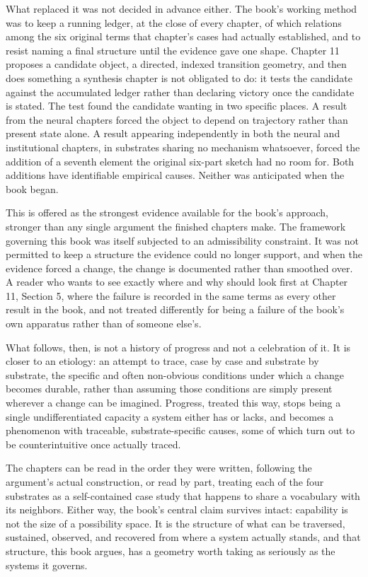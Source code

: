 \documentclass[11pt]{book}
\begin{document}
What replaced it was not decided in advance either. The book's working method was to keep a running ledger, at the close of every chapter, of which relations among the six original terms that chapter's cases had actually established, and to resist naming a final structure until the evidence gave one shape. Chapter 11 proposes a candidate object, a directed, indexed transition geometry, and then does something a synthesis chapter is not obligated to do: it tests the candidate against the accumulated ledger rather than declaring victory once the candidate is stated. The test found the candidate wanting in two specific places. A result from the neural chapters forced the object to depend on trajectory rather than present state alone. A result appearing independently in both the neural and institutional chapters, in substrates sharing no mechanism whatsoever, forced the addition of a seventh element the original six-part sketch had no room for. Both additions have identifiable empirical causes. Neither was anticipated when the book began.

This is offered as the strongest evidence available for the book's approach, stronger than any single argument the finished chapters make. The framework governing this book was itself subjected to an admissibility constraint. It was not permitted to keep a structure the evidence could no longer support, and when the evidence forced a change, the change is documented rather than smoothed over. A reader who wants to see exactly where and why should look first at Chapter 11, Section 5, where the failure is recorded in the same terms as every other result in the book, and not treated differently for being a failure of the book's own apparatus rather than of someone else's.

What follows, then, is not a history of progress and not a celebration of it. It is closer to an etiology: an attempt to trace, case by case and substrate by substrate, the specific and often non-obvious conditions under which a change becomes durable, rather than assuming those conditions are simply present wherever a change can be imagined. Progress, treated this way, stops being a single undifferentiated capacity a system either has or lacks, and becomes a phenomenon with traceable, substrate-specific causes, some of which turn out to be counterintuitive once actually traced.

The chapters can be read in the order they were written, following the argument's actual construction, or read by part, treating each of the four substrates as a self-contained case study that happens to share a vocabulary with its neighbors. Either way, the book's central claim survives intact: capability is not the size of a possibility space. It is the structure of what can be traversed, sustained, observed, and recovered from where a system actually stands, and that structure, this book argues, has a geometry worth taking as seriously as the systems it governs.
\end{document}
